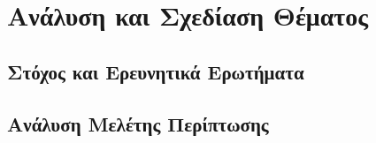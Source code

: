 \documentclass[../main.tex]{subfiles}
\begin{document}
    

\section{Ανάλυση και Σχεδίαση Θέματος}

\subsection{ Στόχος και Ερευνητικά Ερωτήματα}
\subsection{ Ανάλυση Μελέτης Περίπτωσης}
\clearpage
\end{document}
